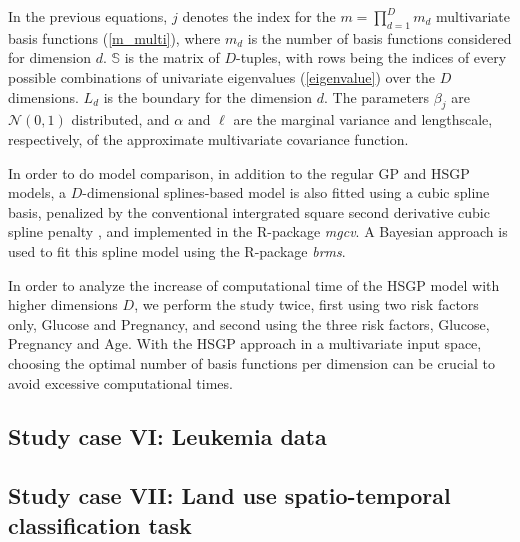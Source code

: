\documentclass[]{interact}
\theoremstyle{plain}%
\theoremstyle{definition}
\theoremstyle{remark}
\begin{document}
\noindent In the previous equations, $j$ denotes the index for the $m= \prod_{d=1}^{D} m_d$ multivariate basis functions (\ref{m_multi}), where $m_d$ is the number of basis functions considered for dimension $d$. $\mathbb{S}$ is the matrix of $D$-tuples, with rows being the indices of every possible combinations of univariate eigenvalues (\ref{eigenvalue}) over the $D$ dimensions. $L_d$ is the boundary for the dimension $d$. The parameters $\beta_j$ are $\mathcal{N}(0,1)$ distributed, and $\alpha$ and $\ell$ are the marginal variance and lengthscale, respectively, of the approximate multivariate covariance function.

In order to do model comparison, in addition to the regular GP and HSGP models, a $D$-dimensional splines-based model is also fitted using a cubic spline basis, penalized by the conventional intergrated square second derivative cubic spline penalty \citep{wood2017generalized}, and implemented in the R-package \textit{mgcv}. A Bayesian approach is used to fit this spline model using the R-package \textit{brms}.

In order to analyze the increase of computational time  of the HSGP model with higher dimensions $D$, we perform the study twice, first using two risk factors only, Glucose and Pregnancy, and second using the three risk factors, Glucose, Pregnancy and Age. With the HSGP approach in a multivariate input space, choosing the optimal number of basis functions per dimension can be crucial to avoid excessive computational times.




\subsection{Study case VI: Leukemia data}\label{sec:bf_caseVI}
\subsection{Study case VII: Land use spatio-temporal classification task}\label{sec:bf_caseVII}
\end{document}
